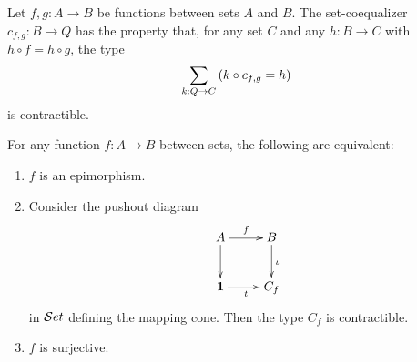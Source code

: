 \documentclass[hott-all.tex]{subfiles}
\begin{document}
% 
% 
% 
\begin{lem}
%
Let $f,g:A\to B$ be functions between sets $A$ and $B$. The
{set-co}equalizer $c_{f,g}:B\to Q$ has the property that, for any set $C$ and any $h:B\to C$ with $h\circ f = h\circ g$, the type
\begin{equation*}
\sm{k:Q\to C} (k\circ c_{f,g} = h)
\end{equation*}
is contractible.
\end{lem}
% 
\begin{lem}
For any function $f:A\to B$ between sets, the following are equivalent:
\begin{enumerate}
\item $f$ is an epimorphism.
\item Consider the pushout diagram
\begin{equation*}
  \xymatrix{
    {A}
    \ar[r]^{f}
    \ar[d]
    &
    {B}
    \ar[d]^{\iota}
    \\
    {\unit}
    \ar[r]_{t}
    &
    {C_f}
  }
\end{equation*}
in $\mathcal{S}et$ defining the mapping cone. Then the type $C_f$ is contractible.
\item $f$ is surjective.
\end{enumerate}
\end{lem}
% 
\end{document}
